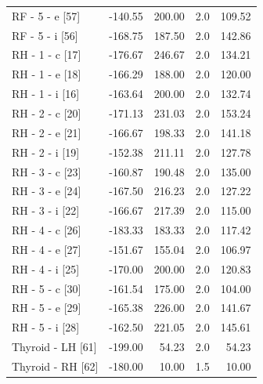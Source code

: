 \documentclass[a4paper,11pt]{article}
\begin{document}
\begin{small}
\begin{longtable}{p{4.5cm}rrrr}
RF - 5 - e [57] & -140.55 & 200.00 & 2.0 & 109.52 \\
RF - 5 - i [56] & -168.75 & 187.50 & 2.0 & 142.86 \\
RH - 1 - c [17] & -176.67 & 246.67 & 2.0 & 134.21 \\
RH - 1 - e [18] & -166.29 & 188.00 & 2.0 & 120.00 \\
RH - 1 - i [16] & -163.64 & 200.00 & 2.0 & 132.74 \\
RH - 2 - c [20] & -171.13 & 231.03 & 2.0 & 153.24 \\
RH - 2 - e [21] & -166.67 & 198.33 & 2.0 & 141.18 \\
RH - 2 - i [19] & -152.38 & 211.11 & 2.0 & 127.78 \\
RH - 3 - c [23] & -160.87 & 190.48 & 2.0 & 135.00 \\
RH - 3 - e [24] & -167.50 & 216.23 & 2.0 & 127.22 \\
RH - 3 - i [22] & -166.67 & 217.39 & 2.0 & 115.00 \\
RH - 4 - c [26] & -183.33 & 183.33 & 2.0 & 117.42 \\
RH - 4 - e [27] & -151.67 & 155.04 & 2.0 & 106.97 \\
RH - 4 - i [25] & -170.00 & 200.00 & 2.0 & 120.83 \\
RH - 5 - c [30] & -161.54 & 175.00 & 2.0 & 104.00 \\
RH - 5 - e [29] & -165.38 & 226.00 & 2.0 & 141.67 \\
RH - 5 - i [28] & -162.50 & 221.05 & 2.0 & 145.61 \\
Thyroid - LH [61] & -199.00 & 54.23 & 2.0 & 54.23 \\
Thyroid - RH [62] & -180.00 & 10.00 & 1.5 & 10.00 \\
\end{longtable}
\end{small}
\end{document}
